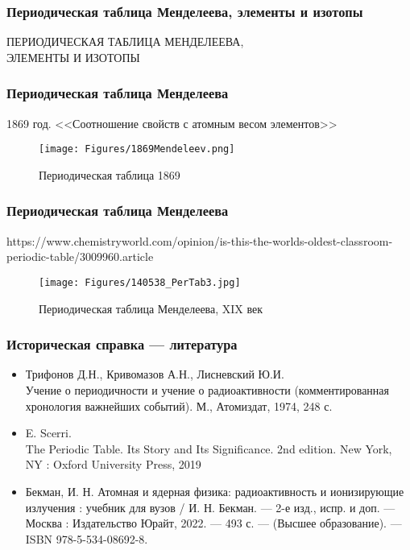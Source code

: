 
\begin{frame}
\frametitle{Периодическая таблица Менделеева, элементы и изотопы}

\begin{center}
ПЕРИОДИЧЕСКАЯ ТАБЛИЦА МЕНДЕЛЕЕВА, \\
ЭЛЕМЕНТЫ И ИЗОТОПЫ
\end{center}

\end{frame}

\begin{frame}
	\frametitle{Периодическая таблица Менделеева}
1869 год. <<Соотношение свойств с атомным весом элементов>> \cite{Mendeleev1869ru}
\begin{figure}[ht] 
	\centering\small
	\unitlength=1mm
	\texttt{[image: Figures/1869Mendeleev.png]} 
	\caption{Периодическая таблица 1869 \cite{Mendeleev1869}} 
	\label{f:1869Mendeleev}
\end{figure}	
\end{frame}

\begin{frame}
	\frametitle{Периодическая таблица Менделеева}
https://www.chemistryworld.com/opinion/is-this-the-worlds-oldest-classroom-periodic-table/3009960.article
	\begin{figure}[ht] 
		\centering\small
		\unitlength=1mm
		\texttt{[image: Figures/140538\_PerTab3.jpg]} 
		\caption{Периодическая таблица Менделеева, XIX век} 
		\label{f:MendeleevTableXIX}
	\end{figure}	
\end{frame}

\begin{frame}
\frametitle{Историческая справка --- литература}

\begin{itemize}
	\item Трифонов Д.Н., Кривомазов А.Н., Лисневский Ю.И. \\ Учение о периодичности и учение о радиоактивности (комментированная хронология важнейших событий). М., Атомиздат, 1974, 248 с.
	\item E. Scerri. \\
	The Periodic Table. Its Story and Its Significance. 
	2nd edition.  New York, NY : Oxford University Press, 2019 
	\item Бекман, И. Н.  Атомная и ядерная физика: радиоактивность и ионизирующие излучения : учебник для вузов / И. Н. Бекман. — 2-е изд., испр. и доп. — Москва : Издательство Юрайт, 2022. — 493 с. — (Высшее образование). — ISBN 978-5-534-08692-8. 
\end{itemize}



	
\end{frame}

